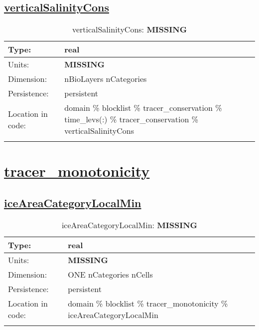 \subsection[verticalSalinityCons]{\hyperref[sec:var_tab_tracer_conservation]{verticalSalinityCons}}
\label{subsec:var_sec_tracer_conservation_verticalSalinityCons}
\begin{center}
\begin{longtable}{| p{2.0in} | p{4.0in} |}
        \hline 
        Type: & real \\
        \hline 
        Units: & {\bf \color{red} MISSING} \\
        \hline 
        Dimension: & nBioLayers nCategories \\
        \hline 
        Persistence: & persistent \\
        \hline 
         Location in code: & domain \% blocklist \% tracer\_conservation \% time\_levs(:) \% tracer\_conservation \% verticalSalinityCons \\
         \hline 
    \caption{verticalSalinityCons: {\bf \color{red} MISSING}}
\end{longtable}
\end{center}
\section[tracer\_monotonicity]{\hyperref[sec:var_tab_tracer_monotonicity]{tracer\_monotonicity}}
\label{sec:var_sec_tracer_monotonicity}
\subsection[iceAreaCategoryLocalMin]{\hyperref[sec:var_tab_tracer_monotonicity]{iceAreaCategoryLocalMin}}
\label{subsec:var_sec_tracer_monotonicity_iceAreaCategoryLocalMin}
\begin{center}
\begin{longtable}{| p{2.0in} | p{4.0in} |}
        \hline 
        Type: & real \\
        \hline 
        Units: & {\bf \color{red} MISSING} \\
        \hline 
        Dimension: & ONE nCategories nCells \\
        \hline 
        Persistence: & persistent \\
        \hline 
         Location in code: & domain \% blocklist \% tracer\_monotonicity \% iceAreaCategoryLocalMin \\
         \hline 
    \caption{iceAreaCategoryLocalMin: {\bf \color{red} MISSING}}
\end{longtable}
\end{center}
